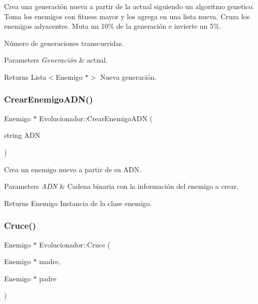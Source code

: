 Crea una generación nueva a partir de la actual siguiendo un algoritmo genetico. Toma los enemigos con fitness mayor y los agrega en una lista nueva. Cruza los enemigos adyacentes. Muta un 10\% de la generación e invierte un 5\%. 

Número de generaciones transcurridas. 
\begin{DoxyParams}{Parameters}
{\em Generación} & actual.\\
\hline
\end{DoxyParams}
\begin{DoxyReturn}{Returns}
Lista$<$\+Enemigo $\ast$$>$ Nueva generación. 
\end{DoxyReturn}
\mbox{\label{classEvolucionador_af2066236151cfa4425826094a0ec8aae}} 
\subsubsection{\texorpdfstring{Crear\+Enemigo\+A\+D\+N()}{CrearEnemigoADN()}}
{\footnotesize\ttfamily Enemigo $\ast$ Evolucionador\+::\+Crear\+Enemigo\+A\+DN (\begin{DoxyParamCaption}\item[{string}]{A\+DN }\end{DoxyParamCaption})}



Crea un enemigo nuevo a partir de su A\+DN. 


\begin{DoxyParams}{Parameters}
{\em A\+DN} & Cadena binaria con la información del enemigo a crear. \\
\hline
\end{DoxyParams}
\begin{DoxyReturn}{Returns}
Enemigo Instancia de la clase enemigo. 
\end{DoxyReturn}
\mbox{\label{classEvolucionador_a7314c24ac7bd26a185ca15e9552e08a1}} 
\subsubsection{\texorpdfstring{Cruce()}{Cruce()}}
{\footnotesize\ttfamily Enemigo $\ast$ Evolucionador\+::\+Cruce (\begin{DoxyParamCaption}\item[{Enemigo $\ast$}]{madre,  }\item[{Enemigo $\ast$}]{padre }\end{DoxyParamCaption})}



